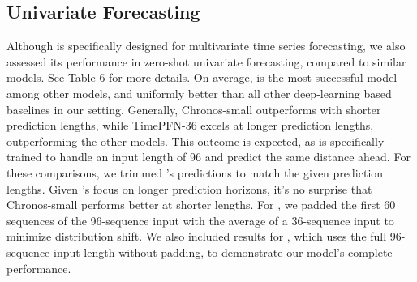 \subsection{Univariate Forecasting}
Although \name is specifically designed for multivariate time series forecasting, we also assessed its performance in zero-shot univariate forecasting, compared to similar models. See Table 6 for more details. On average,  is the most successful model among other models, and uniformly better than all other deep-learning based baselines in our setting. Generally, Chronos-small \cite{ansari2024chronos} outperforms  with shorter prediction lengths, while TimePFN-36 excels at longer prediction lengths, outperforming the other models. This outcome is expected, as \name is specifically trained to handle an input length of 96 and predict the same distance ahead. For these comparisons, we trimmed \name's predictions to match the given prediction lengths. Given \name's focus on longer prediction horizons, it's no surprise that Chronos-small performs better at shorter lengths. For , we padded the first 60 sequences of the 96-sequence input with the average of a 36-sequence input to minimize distribution shift. We also included results for , which uses the full 96-sequence input length without padding, to demonstrate our model’s complete performance. 














